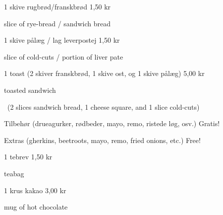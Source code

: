 \documentclass{article}
\begin{document}

\maketitle

\null
\vspace{-0.8cm}


\vspace{0.5cm}

1 skive rugbrød/franskbrød \hfill 1,50 kr

{ slice of rye-bread / sandwich bread}

\vspace{0.3cm}

1 skive pålæg / lag leverpostej \hfill 1,50 kr

{ slice of cold-cuts / portion of liver pate}

\vspace{0.3cm}

1 toast {\large (2 skiver franskbrød, 1 skive ost, og 1 skive pålæg)}
\hfill 5,00 kr

{ toasted sandwich}

\vspace{-0.1cm}

{\english\large\quad\ (2 slices sandwich bread, 1 cheese square, and 1 slice
cold-cuts)}

\vspace{0.3cm}

Tilbehør {\large (drueagurker, rødbeder, mayo, remo, ristede løg, osv.)}
\hfill Gratis!

{\english Extras \large (gherkins, beetroots, mayo, remo, fried onions, etc.)}
\hfill  {\english Free!}

\vspace{0.7cm}


\vspace{0.5cm}

1 tebrev \hfill 1,50 kr

{ teabag}

\vspace{0.3cm}

1 krus kakao \hfill 3,00 kr

{ mug of hot chocolate}

\vspace{0.3cm}
\end{document}
